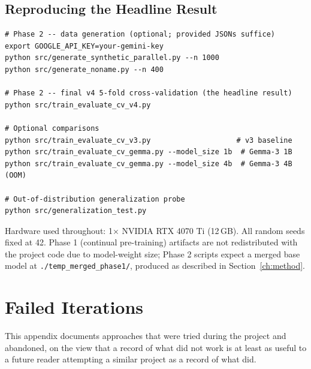 \documentclass[12pt,a4paper]{report}
\begin{document}
\section{Reproducing the Headline Result}

\begin{lstlisting}
# Phase 2 -- data generation (optional; provided JSONs suffice)
export GOOGLE_API_KEY=your-gemini-key
python src/generate_synthetic_parallel.py --n 1000
python src/generate_noname.py --n 400

# Phase 2 -- final v4 5-fold cross-validation (the headline result)
python src/train_evaluate_cv_v4.py

# Optional comparisons
python src/train_evaluate_cv_v3.py                    # v3 baseline
python src/train_evaluate_cv_gemma.py --model_size 1b  # Gemma-3 1B
python src/train_evaluate_cv_gemma.py --model_size 4b  # Gemma-3 4B (OOM)

# Out-of-distribution generalization probe
python src/generalization_test.py
\end{lstlisting}

Hardware used throughout: 1$\times$ NVIDIA RTX 4070 Ti (12\,GB). All random seeds fixed at 42. Phase 1 (continual pre-training) artifacts are not redistributed with the project code due to model-weight size; Phase 2 scripts expect a merged base model at \texttt{./temp\_merged\_phase1/}, produced as described in Section~\ref{ch:method}.

\chapter{Failed Iterations}
\label{app:failed}

This appendix documents approaches that were tried during the project and abandoned, on the view that a record of what did not work is at least as useful to a future reader attempting a similar project as a record of what did.
\end{document}

